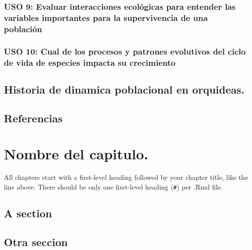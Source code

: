 \documentclass[
]{book}
\theoremstyle{definition}
\theoremstyle{definition}
\theoremstyle{definition}
\theoremstyle{definition}
\theoremstyle{remark}
\begin{document}
\hypertarget{uso-9-evaluar-interacciones-ecoluxf3gicas-para-entender-las-variables-importantes-para-la-supervivencia-de-una-poblaciuxf3n}{%
\subsection{USO 9: Evaluar interacciones ecológicas para entender las variables importantes para la supervivencia de una población}\label{uso-9-evaluar-interacciones-ecoluxf3gicas-para-entender-las-variables-importantes-para-la-supervivencia-de-una-poblaciuxf3n}}

\hypertarget{uso-10-cual-de-los-procesos-y-patrones-evolutivos-del-ciclo-de-vida-de-especies-impacta-su-crecimiento}{%
\subsection{USO 10: Cual de los procesos y patrones evolutivos del ciclo de vida de especies impacta su crecimiento}\label{uso-10-cual-de-los-procesos-y-patrones-evolutivos-del-ciclo-de-vida-de-especies-impacta-su-crecimiento}}

\hypertarget{historia-de-dinamica-poblacional-en-orquideas.}{%
\section{Historia de dinamica poblacional en orquideas.}\label{historia-de-dinamica-poblacional-en-orquideas.}}

\hypertarget{referencias}{%
\section{Referencias}\label{referencias}}

\hypertarget{intro}{%
\chapter{Nombre del capitulo.}\label{intro}}

All chapters start with a first-level heading followed by your chapter title, like the line above. There should be only one first-level heading (\texttt{\#}) per .Rmd file.

\hypertarget{a-section}{%
\section{A section}\label{a-section}}

\hypertarget{otra-seccion}{%
\section{Otra seccion}\label{otra-seccion}}
\end{document}
